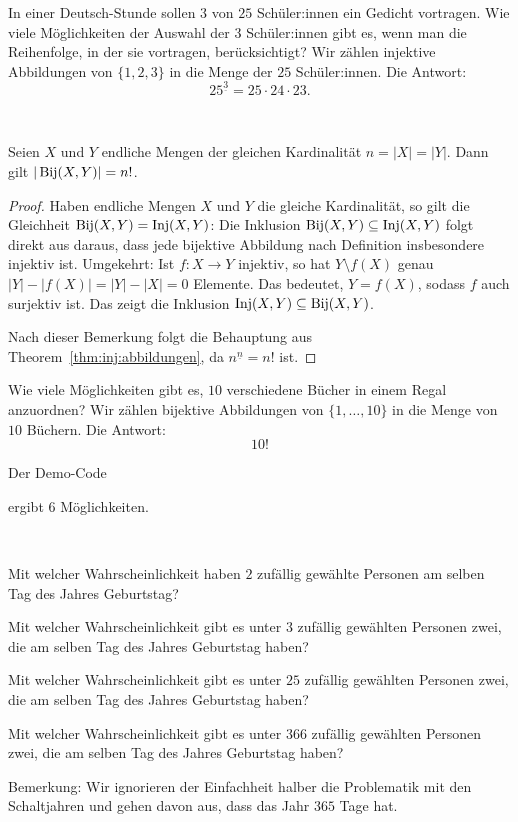 \begin{bsp}
		In einer Deutsch-Stunde sollen  $3$ von $25$ Schüler:innen ein Gedicht vortragen. Wie viele Möglichkeiten der Auswahl der $3$ Schüler:innen gibt es, wenn man die Reihenfolge, in der sie vortragen, berücksichtigt? Wir zählen injektive Abbildungen von $\{1,2,3\}$ in die Menge der $25$ Schüler:innen. Die Antwort: 
		\[
			25^{\underline{3}} = 25 \cdot 24 \cdot 23. 
		\]
\end{bsp} 

\begin{bem}\
 
\end{bem}

\begin{kor}
\label{kor:anzahl-bijektive-abb}
	 Seien $X$ und $Y$ endliche Mengen der gleichen Kardinalität $n = |X| = |Y|$. Dann gilt $|\operatorname{Bij}(X,Y)| = n!$.
\end{kor} 
\begin{proof}
	Haben endliche Mengen $X$ und $Y$ die gleiche Kardinalität, so gilt die Gleichheit $\operatorname{Bij}(X,Y ) = \operatorname{Inj}(X,Y)$: Die Inklusion $\operatorname{Bij}(X,Y ) \subseteq \operatorname{Inj}(X,Y)$ folgt direkt aus daraus, dass jede bijektive Abbildung nach Definition insbesondere injektiv ist. Umgekehrt: Ist $f: X \to Y$ injektiv, so hat $Y \setminus f(X)$ genau $|Y| - |f(X)| = |Y| - |X| =0$ Elemente. Das bedeutet, $Y = f(X)$, sodass $f$ auch surjektiv ist. Das zeigt die Inklusion $\operatorname{Inj}(X,Y) \subseteq \operatorname{Bij}(X,Y)$. 
	
	Nach dieser Bemerkung folgt die Behauptung aus Theorem~\ref{thm:inj:abbildungen}, da $n^{\underline{n}} = n!$ ist.
\end{proof} 

\begin{bsp}
	Wie viele Möglichkeiten gibt es, $10$ verschiedene Bücher in einem Regal anzuordnen? Wir zählen bijektive Abbildungen von $\{1,\ldots,10\}$ in die Menge von $10$ Büchern. Die Antwort: 
	\[
			10!
	\]
\end{bsp} 

\begin{bem} Der Demo-Code 

ergibt $6$ Möglichkeiten. 
\end{bem} 

\begin{aufg}[Geburtstage]\
	\begin{enuma}
		\item Mit welcher Wahrscheinlichkeit haben $2$ zufällig gewählte Personen am selben Tag des Jahres Geburtstag? 
		\item Mit welcher Wahrscheinlichkeit gibt es unter $3$ zufällig gewählten Personen zwei, die am selben Tag des Jahres Geburtstag haben?
		\item Mit welcher Wahrscheinlichkeit gibt es unter $25$ zufällig gewählten Personen zwei, die am selben Tag des Jahres Geburtstag haben?
		\item Mit welcher Wahrscheinlichkeit gibt es unter $366$ zufällig gewählten Personen zwei, die am selben Tag des Jahres Geburtstag haben? 
	\end{enuma}
	Bemerkung: Wir ignorieren der Einfachheit halber die Problematik mit den Schaltjahren und gehen davon aus, dass das Jahr $365$ Tage hat. 
\end{aufg} 

